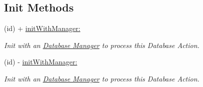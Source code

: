 \subsection*{Init Methods}
\begin{DoxyCompactItemize}
\item 
(id) + \hyperlink{interface_j_p_d_b_manager_action_a95c4b89cda57087f508cee1b3aacac59}{initWithManager:}
\begin{DoxyCompactList}\small\item\em Init with an \hyperlink{interface_j_p_d_b_manager}{Database Manager} to process this Database Action. \item\end{DoxyCompactList}\item 
(id) -\/ \hyperlink{interface_j_p_d_b_manager_action_a95c4b89cda57087f508cee1b3aacac59}{initWithManager:}
\begin{DoxyCompactList}\small\item\em Init with an \hyperlink{interface_j_p_d_b_manager}{Database Manager} to process this Database Action. \item\end{DoxyCompactList}\end{DoxyCompactItemize}
